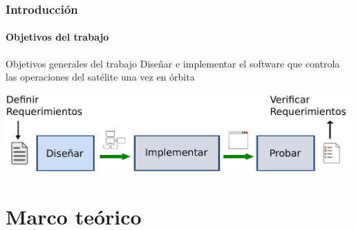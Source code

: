 \documentclass[xcolor=dvipsnames]{beamer}
\begin{document}
    \begin{frame}
        \frametitle{Introducción}
        \framesubtitle{Objetivos del trabajo}
        
        \begin{block}{Objetivos generales del trabajo}
            Diseñar e implementar el software que controla las operaciones del satélite una vez en órbita
        \end{block}
        
        \vspace{1cm}
        
        \includegraphics[width=0.99\textwidth]{img/objetivos.pdf}
        
    \end{frame}
    
    \section{Marco teórico}
\end{document}
